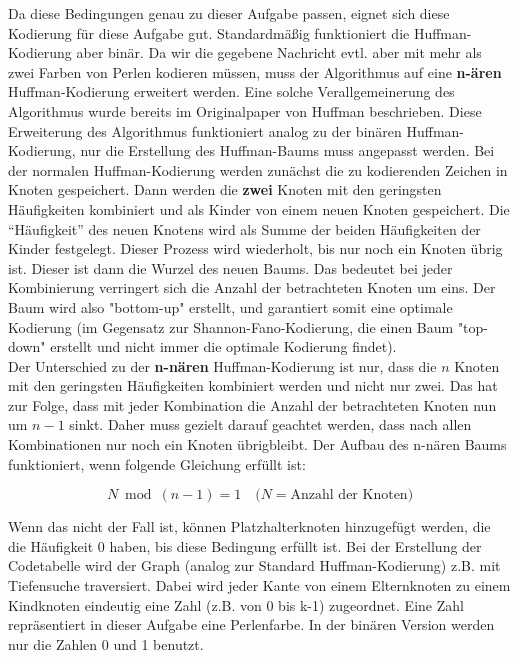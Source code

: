 \documentclass[a4paper,10pt,ngerman]{scrartcl}
\begin{document}
Da diese Bedingungen genau zu dieser Aufgabe passen, eignet sich diese Kodierung für diese Aufgabe gut. Standardmäßig funktioniert die Huffman-Kodierung aber binär. Da wir die gegebene Nachricht evtl. aber mit mehr als zwei Farben von Perlen kodieren müssen, muss der Algorithmus auf eine \textbf{n-ären} Huffman-Kodierung erweitert werden. Eine solche Verallgemeinerung des Algorithmus wurde bereits im Originalpaper von Huffman \cite{paperhuffman} beschrieben.
\newline
Diese Erweiterung des Algorithmus funktioniert analog zu der binären Huffman-Kodierung, nur die Erstellung des Huffman-Baums muss angepasst werden. Bei der normalen Huffman-Kodierung werden zunächst die zu kodierenden Zeichen in Knoten gespeichert.
Dann werden die \textbf{zwei} Knoten mit den geringsten Häufigkeiten kombiniert und als Kinder von einem neuen Knoten gespeichert. Die “Häufigkeit” des neuen Knotens wird als Summe der beiden Häufigkeiten der Kinder festgelegt. Dieser Prozess wird wiederholt, bis nur noch ein Knoten übrig ist. Dieser ist dann die Wurzel des neuen Baums. Das bedeutet bei jeder Kombinierung verringert sich die Anzahl der betrachteten Knoten um eins. Der Baum wird also "bottom-up" erstellt, und garantiert somit eine optimale Kodierung (im Gegensatz zur Shannon-Fano-Kodierung, die einen Baum "top-down" erstellt und nicht immer die optimale Kodierung findet).  \\
\newline
Der Unterschied zu der \textbf{n-nären} Huffman-Kodierung ist nur, dass die $n$ Knoten mit den geringsten Häufigkeiten kombiniert werden und nicht nur zwei. Das hat zur Folge, dass mit jeder Kombination die Anzahl der betrachteten Knoten nun um $n-1$ sinkt. Daher muss gezielt darauf geachtet werden, dass nach allen Kombinationen nur noch ein Knoten übrigbleibt. Der Aufbau des n-nären Baums funktioniert, wenn folgende Gleichung erfüllt ist: 

\begin{equation}
N \bmod (n - 1) = 1 \quad \text{(}N = \text{Anzahl der Knoten}\text{)}
\label{eq:1}
\end{equation}

Wenn das nicht der Fall ist, können Platzhalterknoten hinzugefügt werden, die die Häufigkeit 0 haben, bis diese Bedingung erfüllt ist. 
Bei der Erstellung der Codetabelle wird der Graph (analog zur Standard Huffman-Kodierung) z.B. mit Tiefensuche traversiert. Dabei wird jeder Kante von einem Elternknoten zu einem Kindknoten eindeutig eine Zahl (z.B. von 0 bis k-1) zugeordnet. Eine Zahl repräsentiert in dieser Aufgabe eine Perlenfarbe. In der binären Version werden nur die Zahlen 0 und 1 benutzt. 
\end{document}
